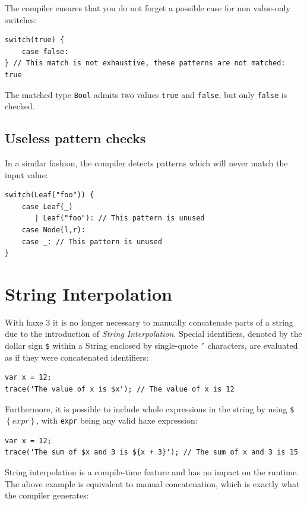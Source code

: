 \documentclass[a4paper,oneside]{book}
\newcommand{\type}[1]{\texttt{#1}}
\newcommand{\expr}[1]{\texttt{#1}}
\begin{document}
The compiler ensures that you do not forget a possible case for non value-only switches:

\begin{lstlisting}
switch(true) {
    case false:
} // This match is not exhaustive, these patterns are not matched: true
\end{lstlisting}

The matched type \type{Bool} admits two values \expr{true} and \expr{false}, but only \expr{false} is checked. 


\subsection{Useless pattern checks}
\label{lf-pattern-matching-unused}

In a similar fashion, the compiler detects patterns which will never match the input value:

\begin{lstlisting}
switch(Leaf("foo")) {
    case Leaf(_)
       | Leaf("foo"): // This pattern is unused
    case Node(l,r):
    case _: // This pattern is unused
}
\end{lstlisting}



\section{String Interpolation}
\label{lf-string-interpolation}

With haxe 3 it is no longer necessary to manually concatenate parts of a string due to the introduction of \emph{String Interpolation}. Special identifiers, denoted by the dollar sign \expr{\$} within a String enclosed by single-quote \expr{'} characters, are evaluated as if they were concatenated identifiers:

\begin{lstlisting}
var x = 12;
trace('The value of x is $x'); // The value of x is 12
\end{lstlisting}
Furthermore, it is possible to include whole expressions in the string by using \expr{\$$\left\{expr\right\}$}, with \expr{expr} being any valid haxe expression:

\begin{lstlisting}
var x = 12;
trace('The sum of $x and 3 is ${x + 3}'); // The sum of x and 3 is 15
\end{lstlisting} 
String interpolation is a compile-time feature and has no impact on the runtime. The above example is equivalent to manual concatenation, which is exactly what the compiler generates:
\end{document}
